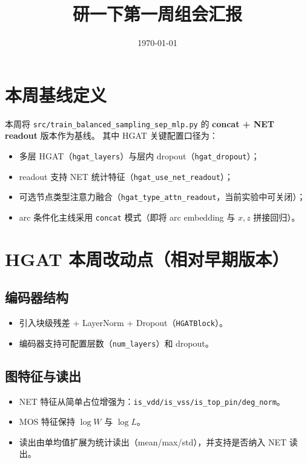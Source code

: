 \documentclass[12pt,a4paper]{ctexart}
\title{研一下第一周组会汇报}
\author{ }
\date{\today}
\begin{document}
\maketitle

\section{本周基线定义}
本周将 \texttt{src/train\_balanced\_sampling\_sep\_mlp.py} 的 \textbf{concat + NET readout} 版本作为基线。
其中 HGAT 关键配置口径为：
\begin{itemize}
  \item 多层 HGAT（\texttt{hgat\_layers}）与层内 dropout（\texttt{hgat\_dropout}）；
  \item readout 支持 NET 统计特征（\texttt{hgat\_use\_net\_readout}）；
  \item 可选节点类型注意力融合（\texttt{hgat\_type\_attn\_readout}，当前实验中可关闭）；
  \item arc 条件化主线采用 \texttt{concat} 模式（即将 arc embedding 与 \(x,z\) 拼接回归）。
\end{itemize}

\section{HGAT 本周改动点（相对早期版本）}
\subsection{编码器结构}
\begin{itemize}
  \item 引入块级残差 + LayerNorm + Dropout（\texttt{HGATBlock}）。
  \item 编码器支持可配置层数（\texttt{num\_layers}）和 dropout。
\end{itemize}

\subsection{图特征与读出}
\begin{itemize}
  \item NET 特征从简单占位增强为：\texttt{is\_vdd/is\_vss/is\_top\_pin/deg\_norm}。
  \item MOS 特征保持 \(\log W\) 与 \(\log L\)。
  \item 读出由单均值扩展为统计读出（mean/max/std），并支持是否纳入 NET 读出。
\end{itemize}
\end{document}
